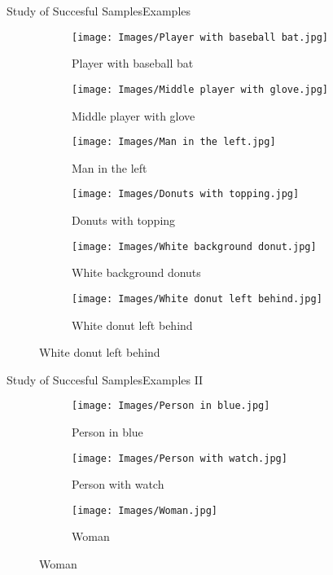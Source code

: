 \documentclass{beamer}
\begin{document}
\begin{frame}{Study of Succesful Samples}{Examples}
  \vspace*{-.75cm}
  \begin{figure}
    \centering
    \begin{subfigure}[t]{.32\textwidth}
      \centering
      \caption{Player with baseball bat}
      \texttt{[image: Images/Player with baseball bat.jpg]}
    \end{subfigure}\hfill
    \begin{subfigure}[t]{.32\textwidth}
      \centering
      \caption{Middle player with glove}
      \texttt{[image: Images/Middle player with glove.jpg]}
    \end{subfigure}\hfill
    \begin{subfigure}[t]{.32\textwidth}
      \centering
      \caption{Man in the left}
      \texttt{[image: Images/Man in the left.jpg]}
    \end{subfigure}

    \bigskip
    \begin{subfigure}[t]{.32\textwidth}
      \centering
      \caption{Donuts with topping}
      \texttt{[image: Images/Donuts with topping.jpg]}
    \end{subfigure}\hfill
    \begin{subfigure}[t]{.32\textwidth}
      \centering
      \caption{White background donuts}
      \texttt{[image: Images/White background donut.jpg]}
    \end{subfigure}\hfill
    \begin{subfigure}[t]{.32\textwidth}
      \centering
      \caption{White donut left behind}
      \texttt{[image: Images/White donut left behind.jpg]}
    \end{subfigure}
  \end{figure}
\end{frame}

\begin{frame}{Study of Succesful Samples}{Examples II}
  \vspace*{-.5cm}
  \begin{figure}
    \centering
    \begin{subfigure}[t]{.3\textwidth}
      \centering
      \caption{Person in blue}
      \texttt{[image: Images/Person in blue.jpg]}
    \end{subfigure}\hfill
    \begin{subfigure}[t]{.3\textwidth}
      \centering
      \caption{Person with watch}
      \texttt{[image: Images/Person with watch.jpg]}
    \end{subfigure}\hfill
    \begin{subfigure}[t]{.3\textwidth}
      \centering
      \caption{Woman}
      \texttt{[image: Images/Woman.jpg]}
    \end{subfigure}
  \end{figure}
\end{frame}
\end{document}
